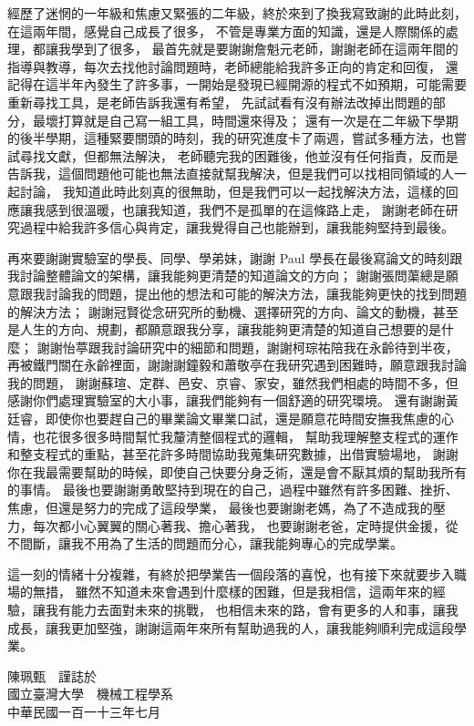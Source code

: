 \begin{acknowledgementsCH}
    \fontsize{12pt}{18pt}\selectfont
    經歷了迷惘的一年級和焦慮又緊張的二年級，終於來到了換我寫致謝的此時此刻，在這兩年間，感覺自己成長了很多，
    不管是專業方面的知識，還是人際關係的處理，都讓我學到了很多，
    最首先就是要謝謝詹魁元老師，謝謝老師在這兩年間的指導與教導，每次去找他討論問題時，老師總能給我許多正向的肯定和回復，
    還記得在這半年內發生了許多事，一開始是發現已經開源的程式不如預期，可能需要重新尋找工具，是老師告訴我還有希望，
    先試試看有沒有辦法改掉出問題的部分，最壞打算就是自己寫一組工具，時間還來得及；
    還有一次是在二年級下學期的後半學期，這種緊要關頭的時刻，我的研究進度卡了兩週，嘗試多種方法，也嘗試尋找文獻，但都無法解決，
    老師聽完我的困難後，他並沒有任何指責，反而是告訴我，這個問題他可能也無法直接就幫我解決，但是我們可以找相同領域的人一起討論，
    我知道此時此刻真的很無助，但是我們可以一起找解決方法，這樣的回應讓我感到很溫暖，也讓我知道，我們不是孤單的在這條路上走，
    謝謝老師在研究過程中給我許多信心與肯定，讓我覺得自己也能辦到，讓我能夠堅持到最後。

    再來要謝謝實驗室的學長、同學、學弟妹，謝謝 Paul 學長在最後寫論文的時刻跟我討論整體論文的架構，讓我能夠更清楚的知道論文的方向；
    謝謝張問蕖總是願意跟我討論我的問題，提出他的想法和可能的解決方法，讓我能夠更快的找到問題的解決方法；
    謝謝冠賢從念研究所的動機、選擇研究的方向、論文的動機，甚至是人生的方向、規劃，都願意跟我分享，讓我能夠更清楚的知道自己想要的是什麼；
    謝謝怡葶跟我討論研究中的細節和問題，謝謝柯琮祐陪我在永齡待到半夜，再被鐵門關在永齡裡面，謝謝謝鐘毅和蕭敬亭在我研究遇到困難時，願意跟我討論我的問題，
    謝謝蘇瑄、定群、邑安、京睿、家安，雖然我們相處的時間不多，但感謝你們處理實驗室的大小事，讓我們能夠有一個舒適的研究環境。
    還有謝謝黃廷睿，即使你也要趕自己的畢業論文畢業口試，還是願意花時間安撫我焦慮的心情，也花很多很多時間幫忙我釐清整個程式的邏輯，
    幫助我理解整支程式的運作和整支程式的重點，甚至花許多時間協助我蒐集研究數據，出借實驗場地，
    謝謝你在我最需要幫助的時候，即使自己快要分身乏術，還是會不厭其煩的幫助我所有的事情。
    最後也要謝謝勇敢堅持到現在的自己，過程中雖然有許多困難、挫折、焦慮，但還是努力的完成了這段學業，
    最後也要謝謝老媽，為了不造成我的壓力，每次都小心翼翼的關心著我、擔心著我，
    也要謝謝老爸，定時提供金援，從不間斷，讓我不用為了生活的問題而分心，讓我能夠專心的完成學業。
    
    這一刻的情緒十分複雜，有終於把學業告一個段落的喜悅，也有接下來就要步入職場的無措，
    雖然不知道未來會遇到什麼樣的困難，但是我相信，這兩年來的經驗，讓我有能力去面對未來的挑戰，
    也相信未來的路，會有更多的人和事，讓我成長，讓我更加堅強，謝謝這兩年來所有幫助過我的人，讓我能夠順利完成這段學業。

    \begin{flushright}
        陳珮甄　謹誌於\\
        國立臺灣大學　機械工程學系\\
        中華民國一百一十三年七月
    \end{flushright}
 
\end{acknowledgementsCH}